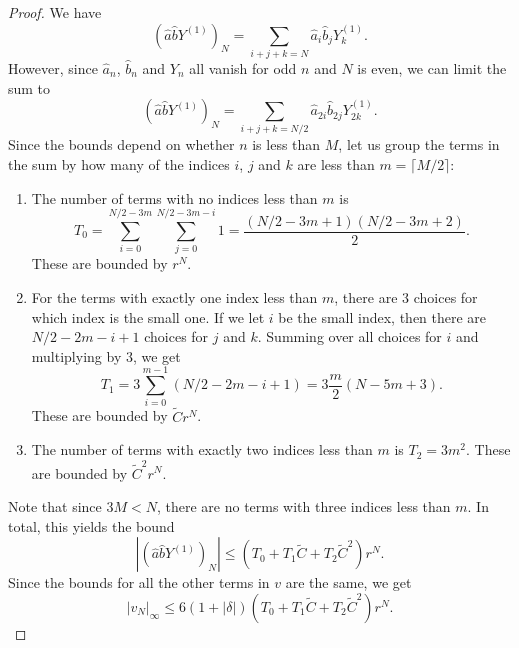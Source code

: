 \documentclass[11pt]{article}
\begin{document}
\begin{proof}
  We have
  \begin{equation*}
    (\hat{a}\hat{b}Y^{(1)})_{N} = \sum_{i + j + k = N}\hat{a}_{i}\hat{b}_{j}Y^{(1)}_{k}.
  \end{equation*}
  However, since \(\hat{a}_{n}\), \(\hat{b}_{n}\) and \(Y_{n}\) all
  vanish for odd \(n\) and \(N\) is even, we can limit the sum to
  \begin{equation*}
    (\hat{a}\hat{b}Y^{(1)})_{N} = \sum_{i + j + k = N/2}\hat{a}_{2i}\hat{b}_{2j}Y^{(1)}_{2k}.
  \end{equation*}
  Since the bounds depend on whether \(n\) is less than \(M\), let
  us group the terms in the sum by how many of the indices \(i\),
  \(j\) and \(k\) are less than \(m = \lceil M / 2 \rceil\):
  \begin{enumerate}
  \item The number of terms with no indices less than \(m\) is
    \begin{equation*}
      T_{0} = \sum_{i = 0}^{N/2 - 3m}\sum_{j = 0}^{N/2 - 3m - i} 1 = \frac{(N/2 - 3m + 1)(N/2 - 3m + 2)}{2}.
    \end{equation*}
    These are bounded by \(r^{N}\).
  \item For the terms with exactly one index less than \(m\), there are
    \(3\) choices for which index is the small one. If we let \(i\) be
    the small index, then there are \(N/2 - 2m - i + 1\) choices for
    \(j\) and \(k\). Summing over all choices for \(i\) and
    multiplying by \(3\), we get
    \begin{equation*}
      T_{1} = 3\sum_{i = 0}^{m - 1} \left(N/2 - 2m - i + 1\right) = 3\frac{m}{2}\left(N - 5m + 3\right).
    \end{equation*}
    These are bounded by \(\tilde{C}r^{N}\).
  \item The number of terms with exactly two indices less than \(m\)
    is \(T_{2} = 3m^{2}\). These are bounded by \(\tilde{C}^{2}r^{N}\).
  \end{enumerate}
  Note that since \(3M < N\), there are no terms with three indices
  less than \(m\). In total, this yields the bound
  \begin{equation*}
    |(\hat{a}\hat{b}Y^{(1)})_{N}| \leq (T_{0} + T_{1}\tilde{C} + T_{2}\tilde{C}^{2})r^{N}.
  \end{equation*}
  Since the bounds for all the other terms in \(v\) are the same, we
  get
  \begin{equation*}
    |v_{N}|_{\infty}
    \leq 6(1 + |\delta|)(T_{0} + T_{1}\tilde{C} + T_{2}\tilde{C}^{2})r^{N}.
  \end{equation*}


\end{proof}
\end{document}
